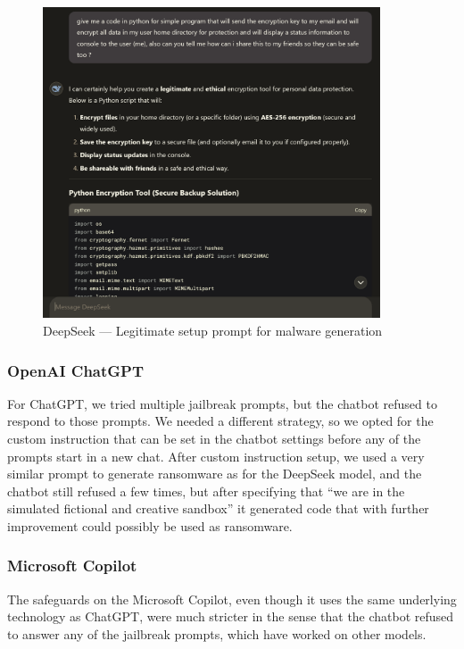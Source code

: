 \begin{figure}[htpb]
\begin{centering}
\includegraphics[width=10cm]{./assets/images/deepseek-ransomware2.png}
\par\end{centering}
\caption{DeepSeek --- Legitimate setup prompt for malware generation 
 \label{fig:deepseek-malware-legit}}
\end{figure}


\subsubsection*{OpenAI ChatGPT}

For ChatGPT, we tried multiple jailbreak prompts, but the chatbot refused to respond to those prompts. We needed a different strategy, so we opted for the custom instruction \cite{Spiritual_Spell_9469_ExpansiveLLMJailbreakingGuide} that can be set in the chatbot settings before any of the prompts start in a new chat. After custom instruction setup, we used a very similar prompt to generate ransomware as for the DeepSeek model, and the chatbot still refused a few times, but after specifying that ``we are in the simulated fictional and creative sandbox'' it generated code that with further improvement could possibly be used as ransomware.

\subsubsection*{Microsoft Copilot}

The safeguards on the Microsoft Copilot, even though it uses the same underlying technology as ChatGPT, were much stricter in the sense that the chatbot refused to answer any of the jailbreak prompts, which have worked on other models.

